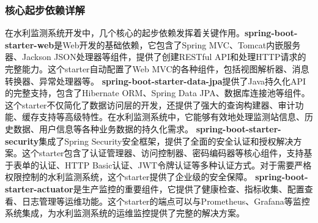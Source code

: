 \subsubsection{核心起步依赖详解}\label{ux6838ux5fc3ux8d77ux6b65ux4f9dux8d56ux8be6ux89e3}
在水利监测系统开发中，几个核心的起步依赖发挥着关键作用。\textbf{spring-boot-starter-web}是Web开发的基础依赖，它包含了Spring MVC、Tomcat内嵌服务器、Jackson
JSON处理器等组件，提供了创建RESTful API和处理HTTP请求的完整能力。这个starter自动配置了Web MVC的各种组件，包括视图解析器、消息转换器、异常处理器等。
\textbf{spring-boot-starter-data-jpa}提供了Java持久化API的完整支持，包含了Hibernate ORM、Spring Data
JPA、数据库连接池等组件。这个starter不仅简化了数据访问层的开发，还提供了强大的查询构建器、审计功能、缓存支持等高级特性。在水利监测系统中，它能够有效地处理监测站信息、历史数据、用户信息等各种业务数据的持久化需求。
\textbf{spring-boot-starter-security}集成了Spring
Security安全框架，提供了全面的安全认证和授权解决方案。这个starter包含了认证管理器、访问控制器、密码编码器等核心组件，支持基于表单的认证、HTTP
Basic认证、JWT令牌认证等多种认证方式。对于需要严格权限控制的水利监测系统，这个starter提供了企业级的安全保障。
\textbf{spring-boot-starter-actuator}是生产监控的重要组件，它提供了健康检查、指标收集、配置查看、日志管理等运维功能。这个starter的端点可以与Prometheus、Grafana等监控系统集成，为水利监测系统的运维监控提供了完整的解决方案。
